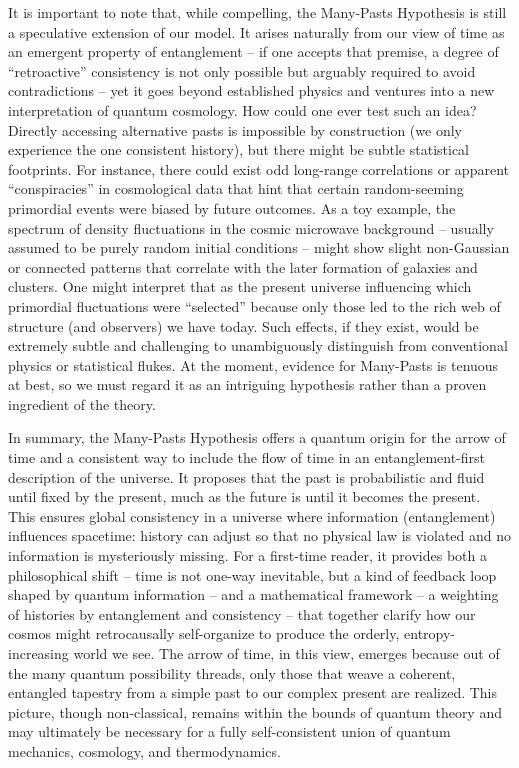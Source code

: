 \documentclass[11pt]{article}
\begin{document}
It is important to note that, while compelling, the Many-Pasts Hypothesis is still a speculative extension of our model. It arises naturally from our view of time as an emergent property of entanglement – if one accepts that premise, a degree of “retroactive” consistency is not only possible but arguably required to avoid contradictions – yet it goes beyond established physics and ventures into a new interpretation of quantum cosmology. How could one ever test such an idea? Directly accessing alternative pasts is impossible by construction (we only experience the one consistent history), but there might be subtle statistical footprints. For instance, there could exist odd long-range correlations or apparent “conspiracies” in cosmological data that hint that certain random-seeming primordial events were biased by future outcomes. As a toy example, the spectrum of density fluctuations in the cosmic microwave background – usually assumed to be purely random initial conditions – might show slight non-Gaussian or connected patterns that correlate with the later formation of galaxies and clusters. One might interpret that as the present universe influencing which primordial fluctuations were “selected” because only those led to the rich web of structure (and observers) we have today. Such effects, if they exist, would be extremely subtle and challenging to unambiguously distinguish from conventional physics or statistical flukes. At the moment, evidence for Many-Pasts is tenuous at best, so we must regard it as an intriguing hypothesis rather than a proven ingredient of the theory.

In summary, the Many-Pasts Hypothesis offers a quantum origin for the arrow of time and a consistent way to include the flow of time in an entanglement-first description of the universe. It proposes that the past is probabilistic and fluid until fixed by the present, much as the future is until it becomes the present. This ensures global consistency in a universe where information (entanglement) influences spacetime: history can adjust so that no physical law is violated and no information is mysteriously missing. For a first-time reader, it provides both a philosophical shift – time is not one-way inevitable, but a kind of feedback loop shaped by quantum information – and a mathematical framework – a weighting of histories by entanglement and consistency – that together clarify how our cosmos might retrocausally self-organize to produce the orderly, entropy-increasing world we see. The arrow of time, in this view, emerges because out of the many quantum possibility threads, only those that weave a coherent, entangled tapestry from a simple past to our complex present are realized. This picture, though non-classical, remains within the bounds of quantum theory and may ultimately be necessary for a fully self-consistent union of quantum mechanics, cosmology, and thermodynamics.
\end{document}
